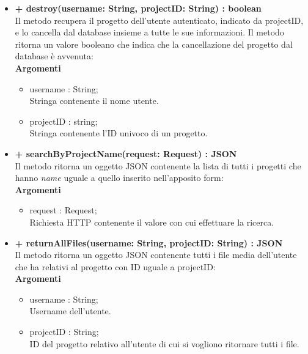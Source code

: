 \begin{itemize}
			\item \textbf{+ destroy(username: String, projectID: String) : boolean}\\
			Il metodo recupera il progetto dell'utente autenticato, indicato da projectID, e lo cancella dal \gls{database} insieme a tutte le sue informazioni. Il metodo ritorna un valore booleano che indica che la cancellazione del progetto dal \gls{database} è avvenuta:\\
			\textbf{Argomenti}
			\begin{itemize}
				\item username : String;\\
				Stringa contenente il nome utente.
				\item projectID : string; \\
				Stringa contenente l'ID univoco di un progetto.
			\end{itemize}
			
			\item \textbf{+ searchByProjectName(request: Request) : JSON}\\
			Il metodo ritorna un oggetto \gls{JSON} contenente la lista di tutti i progetti che hanno \textit{name} uguale a quello inserito nell'apposito form:\\
			\textbf{Argomenti}
			\begin{itemize}
				\item request : Request;\\
				Richiesta HTTP contenente il valore con cui effettuare la ricerca.
			\end{itemize}
			
			\item \textbf{+ returnAllFiles(username: String, projectID: String) : JSON}\\
			Il metodo ritorna un oggetto \gls{JSON} contenente tutti i file media dell'utente che ha relativi al progetto con ID uguale a projectID:\\
			\textbf{Argomenti}
			\begin{itemize}
				\item username : String;\\
				Username dell'utente.
				\item projectID : String;\\
				ID del progetto relativo all'utente di cui si vogliono ritornare tutti i file.
			\end{itemize}
			

\end{itemize}
